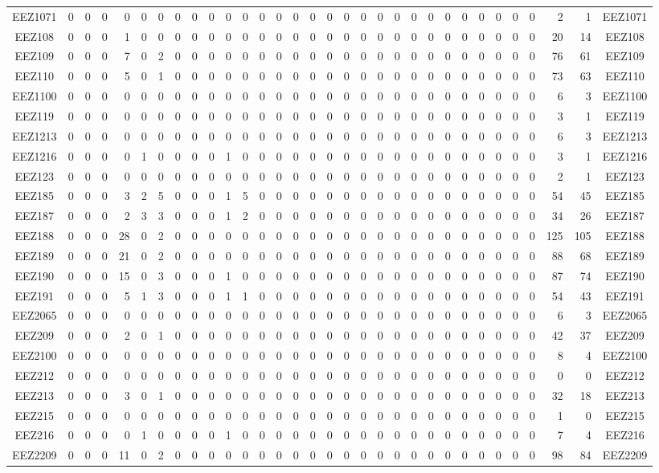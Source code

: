 \documentclass[10pt,a4paper,twoside]{report}
\begin{document}
{\begin{tabular}{crrrrrrrrrrrrrrrrrrrrrrrrrrrrrrc}
EEZ1071&0&0&0&0&0&0&0&0&0&0&0&0&0&0&0&0&0&0&0&0&0&0&0&0&0&0&0&0&2&1&EEZ1071\\
EEZ108&0&0&0&1&0&0&0&0&0&0&0&0&0&0&0&0&0&0&0&0&0&0&0&0&0&0&0&0&20&14&EEZ108\\
EEZ109&0&0&0&7&0&2&0&0&0&0&0&0&0&0&0&0&0&0&0&0&0&0&0&0&0&0&0&0&76&61&EEZ109\\
EEZ110&0&0&0&5&0&1&0&0&0&0&0&0&0&0&0&0&0&0&0&0&0&0&0&0&0&0&0&0&73&63&EEZ110\\
EEZ1100&0&0&0&0&0&0&0&0&0&0&0&0&0&0&0&0&0&0&0&0&0&0&0&0&0&0&0&0&6&3&EEZ1100\\
EEZ119&0&0&0&0&0&0&0&0&0&0&0&0&0&0&0&0&0&0&0&0&0&0&0&0&0&0&0&0&3&1&EEZ119\\
EEZ1213&0&0&0&0&0&0&0&0&0&0&0&0&0&0&0&0&0&0&0&0&0&0&0&0&0&0&0&0&6&3&EEZ1213\\
EEZ1216&0&0&0&0&1&0&0&0&0&1&0&0&0&0&0&0&0&0&0&0&0&0&0&0&0&0&0&0&3&1&EEZ1216\\
EEZ123&0&0&0&0&0&0&0&0&0&0&0&0&0&0&0&0&0&0&0&0&0&0&0&0&0&0&0&0&2&1&EEZ123\\
EEZ185&0&0&0&3&2&5&0&0&0&1&5&0&0&0&0&0&0&0&0&0&0&0&0&0&0&0&0&0&54&45&EEZ185\\
EEZ187&0&0&0&2&3&3&0&0&0&1&2&0&0&0&0&0&0&0&0&0&0&0&0&0&0&0&0&0&34&26&EEZ187\\
EEZ188&0&0&0&28&0&2&0&0&0&0&0&0&0&0&0&0&0&0&0&0&0&0&0&0&0&0&0&0&125&105&EEZ188\\
EEZ189&0&0&0&21&0&2&0&0&0&0&0&0&0&0&0&0&0&0&0&0&0&0&0&0&0&0&0&0&88&68&EEZ189\\
EEZ190&0&0&0&15&0&3&0&0&0&1&0&0&0&0&0&0&0&0&0&0&0&0&0&0&0&0&0&0&87&74&EEZ190\\
EEZ191&0&0&0&5&1&3&0&0&0&1&1&0&0&0&0&0&0&0&0&0&0&0&0&0&0&0&0&0&54&43&EEZ191\\
EEZ2065&0&0&0&0&0&0&0&0&0&0&0&0&0&0&0&0&0&0&0&0&0&0&0&0&0&0&0&0&6&3&EEZ2065\\
EEZ209&0&0&0&2&0&1&0&0&0&0&0&0&0&0&0&0&0&0&0&0&0&0&0&0&0&0&0&0&42&37&EEZ209\\
EEZ2100&0&0&0&0&0&0&0&0&0&0&0&0&0&0&0&0&0&0&0&0&0&0&0&0&0&0&0&0&8&4&EEZ2100\\
EEZ212&0&0&0&0&0&0&0&0&0&0&0&0&0&0&0&0&0&0&0&0&0&0&0&0&0&0&0&0&0&0&EEZ212\\
EEZ213&0&0&0&3&0&1&0&0&0&0&0&0&0&0&0&0&0&0&0&0&0&0&0&0&0&0&0&0&32&18&EEZ213\\
EEZ215&0&0&0&0&0&0&0&0&0&0&0&0&0&0&0&0&0&0&0&0&0&0&0&0&0&0&0&0&1&0&EEZ215\\
EEZ216&0&0&0&0&1&0&0&0&0&1&0&0&0&0&0&0&0&0&0&0&0&0&0&0&0&0&0&0&7&4&EEZ216\\
EEZ2209&0&0&0&11&0&2&0&0&0&0&0&0&0&0&0&0&0&0&0&0&0&0&0&0&0&0&0&0&98&84&EEZ2209\\

\end{tabular}}
\end{document}
